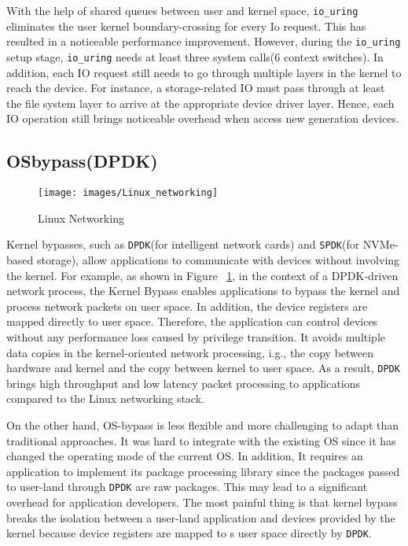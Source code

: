 With the help of shared queues between user and kernel space, 
\verb|io_uring| eliminates the user kernel boundary-crossing for every
 Io request. This has resulted in a noticeable performance improvement. 
 However, during the \verb|io_uring| setup stage, \verb|io_uring| 
 needs at least three system calls(6 context switches). In addition, each IO request still 
 needs to go through multiple layers in the kernel to reach the device. 
 For instance, a storage-related IO must pass through at least the file 
 system layer to arrive at the appropriate device driver layer. Hence, 
 each IO operation still brings noticeable overhead when access new 
 generation devices.
\subsection{OSbypass(DPDK)}
\begin{figure}[tbp]
  \centering
  \texttt{[image: images/Linux\_networking]}
  \caption[Short description]{Linux Networking}
  \label{fig:Linux_networking}
\end{figure}

Kernel bypasses, such as \verb|DPDK|(for intelligent network cards) and 
\verb|SPDK|(for NVMe-based storage), allow applications to communicate 
with devices without involving the kernel. For example, as shown 
in Figure ~\ref{fig:Linux_networking}, in the context of a 
DPDK-driven network process, the Kernel Bypass enables applications 
to bypass the kernel and process network packets on user space. In addition, 
the device registers are mapped directly to user space. 
Therefore, the application can control devices without 
any performance loss caused by privilege transition. 
It avoids multiple data copies in the kernel-oriented network 
processing, i.g., the copy between hardware and kernel and the 
copy between kernel to user space. As a result, \verb|DPDK| brings high 
throughput and low latency packet processing to applications 
compared to the Linux networking stack.

On the other hand, OS-bypass is less flexible and more 
challenging to adapt than traditional approaches. It was 
hard to integrate with the existing OS since it has 
changed the operating mode of the current OS. 
In addition, It requires an application to implement its 
package processing library since the packages passed to 
user-land through \verb|DPDK| are raw packages. This may lead to 
a significant overhead for application developers. 
The most painful thing is that kernel bypass breaks 
the isolation between a user-land application and devices
 provided by the kernel because device registers are mapped to
 s user space directly by \verb|DPDK|.

